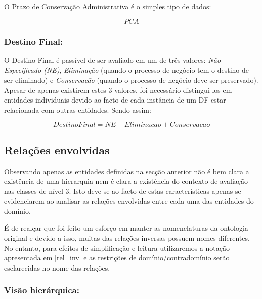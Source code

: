 \documentclass[tikz,runningheads,a4paper]{llncs}
\begin{document}
O Prazo de Conservação Administrativa é o simples tipo de dados:

\begin{equation*}
    PCA
\end{equation*}

\subsubsection{Destino Final:}

O Destino Final é passível de ser avaliado em um de três valores: \textit{Não Especificado (NE)}, \textit{Eliminação} (quando o processo de negócio tem o destino de ser eliminado) e \textit{Conservação} (quando o processo de negócio deve ser preservado). Apesar de apenas existirem estes 3 valores, foi necessário distingui-los em entidades individuais devido ao facto de cada instância de um DF estar relacionada com outras entidades. Sendo assim:

\begin{equation*}
    DestinoFinal = NE + Eliminacao + Conservacao
\end{equation*}

\subsection{Relações envolvidas}

Observando apenas as entidades definidas na secção anterior não é bem clara a existência de uma hierarquia nem é clara a existência do contexto de avaliação nas classes de nível 3. Isto deve-se ao facto de estas características apenas se evidenciarem ao analisar as relações envolvidas entre cada uma das entidades do domínio.

É de realçar que foi feito um esforço em manter as nomenclaturas da ontologia original e devido a isso, muitas das relações inversas possuem nomes diferentes. No entanto, para efeitos de simplificação e leitura utilizaremos a notação apresentada em \ref{rel_inv} e as restrições de domínio/contradomínio serão esclarecidas no nome das relações.

\subsubsection{Visão hierárquica:}
\end{document}
